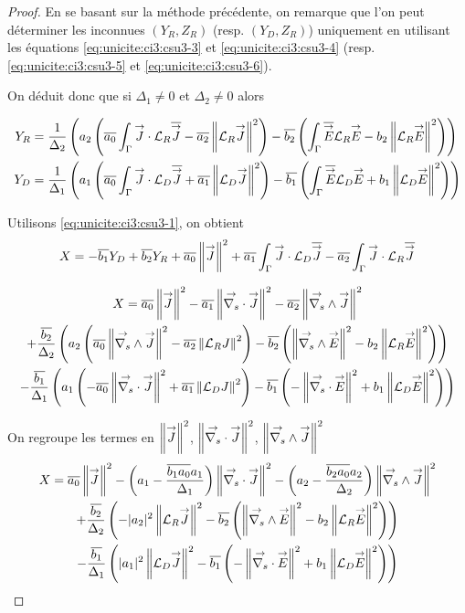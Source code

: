   \begin{proof}
    En se basant sur la méthode précédente, on remarque que l'on peut déterminer les inconnues \((Y_R,Z_R)\) (resp. \((Y_D,Z_R)\)) uniquement en utilisant les équations \eqref{eq:unicite:ci3:csu3-3} et \eqref{eq:unicite:ci3:csu3-4} (resp. \eqref{eq:unicite:ci3:csu3-5} et \eqref{eq:unicite:ci3:csu3-6}).

    On déduit donc que si \(\Delta_1 \not = 0\) et \(\Delta_2 \not = 0\) alors

    \begin{align*}
      Y_R &= \frac{1}{\Delta_2}\left(a_2\left(\conj{a_0}\int_\Gamma \vJ\cdot\LR\conj{\vJ} - \conj{a_2}\norm{\LR \vJ}^2\right)  -\conj{b_2}\left(\int_\Gamma \conj{\vE}\LR{\vE} - b_2 \norm{\LR \vE}^2\right)\right) \\
      Y_D &= \frac{1}{\Delta_1}\left(a_1\left(\conj{a_0}\int_\Gamma \vJ\cdot\LD\conj{\vJ} + \conj{a_1}\norm{\LD \vJ}^2\right)  -\conj{b_1}\left(\int_\Gamma \conj{\vE}\LD{\vE} + b_1 \norm{\LD \vE}^2\right)\right)
    \end{align*}

    Utilisons \eqref{eq:unicite:ci3:csu3-1}, on obtient
    \begin{equation*}
      X = -\conj{b_1} Y_D + \conj{b_2} Y_R + \conj{a_0} \norm{\vJ}^2 + \conj{a_1} \int_\Gamma \vJ \cdot \LD \conj{\vJ} - \conj{a_2} \int_\Gamma \vJ \cdot \LR \conj{\vJ}
    \end{equation*}

    \begin{multline*}
      X = \conj{a_0} \norm{\vJ }^2 - \conj{a_1} \norm{\vdivs \vJ }^2 - \conj{a_2} \norm{\vrots \vJ }^2
      \\
      + \frac{\conj{b_2}}{\Delta_2}\left(a_2\left(\conj{a_0}\norm{\vrots \vJ}^2 - \conj{a_2}\norm{\LR J}^2\right)  -\conj{b_2}\left(\norm{\vrots\vE}^2 - b_2 \norm{\LR \vE }^2\right)\right)
      \\
      - \frac{\conj{b_1}}{\Delta_1}\left(a_1\left(-\conj{a_0}\norm{\vdivs\vJ}^2 + \conj{a_1}\norm{\LD J}^2\right)  -\conj{b_1}\left(-\norm{\vdivs\vE}^2 + b_1 \norm{\LD \vE }^2\right)\right)
    \end{multline*}

    On regroupe les termes en \(\norm{\vJ}^2\), \(\norm{\vdivs\vJ}^2\),  \(\norm{\vrots\vJ}^2\)
    \begin{multline*}
      X = \conj{a_0} \norm{\vJ }^2 - \left(a_1 - \frac{\conj{b_1a_0}a_1}{\Delta_1}\right) \norm{\vdivs \vJ}^2 - \left(a_2 - \frac{\conj{b_2a_0}a_2}{\Delta_2}\right) \norm{\vrots \vJ }^2
      \\
      + \frac{\conj{b_2}}{\Delta_2}\left( - |a_2|^2\norm{\LR \vJ}^2  - \conj{b_2}\left(\norm{\vrots\vE}^2 - b_2 \norm{\LR \vE }^2\right)\right) 
      \\
      - \frac{\conj{b_1}}{\Delta_1}\left( |a_1|^2\norm{\LD \vJ}^2  - \conj{b_1}\left(-\norm{\vdivs\vE}^2 + b_1 \norm{\LD \vE }^2\right)\right)
    \end{multline*}


\end{proof}

